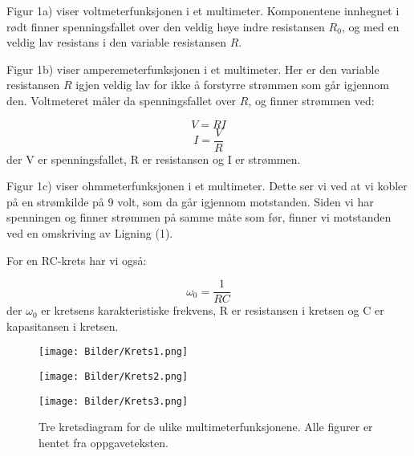\documentclass[norsk,a4paper,12pt]{article}
\begin{document}
Figur 1a) viser voltmeterfunksjonen i et multimeter. Komponentene innhegnet i rødt finner spenningsfallet over den veldig høye indre resistansen $R_0$, og med en veldig lav resistans i den variable resistansen $R$. 

Figur 1b) viser amperemeterfunksjonen i et multimeter. Her er den variable resistansen $R$ igjen veldig lav for ikke å forstyrre strømmen som går igjennom den. Voltmeteret måler da spenningsfallet over $R$, og finner strømmen ved:


\begin{equation}
V = RI
\label{eq:ohm}
\end{equation}
\[I = \frac{V}{R}\]
der V er spenningsfallet, R er resistansen og I er strømmen.

Figur 1c) viser ohmmeterfunksjonen i et multimeter. Dette ser vi ved at vi kobler på en strømkilde på 9 volt, som da går igjennom motstanden. Siden vi har spenningen og finner strømmen på samme måte som før, finner vi motstanden ved en omskriving av Ligning (1).

For en RC-krets har vi også:

\begin{equation}
\omega_0 = \frac{1}{RC}
\label{eq:ohm}
\end{equation}
der $\omega_0$ er kretsens karakteristiske frekvens, R er resistansen i kretsen og C er kapasitansen i kretsen. 



\begin{figure}
\centering
\begin{minipage}{.3\textwidth}
  \centering
  \texttt{[image: Bilder/Krets1.png]}\\
  \label{fig:krets1}
\end{minipage}%
\begin{minipage}{.1\textwidth}
  \centering
  \label{fig:space}
\end{minipage}%
\begin{minipage}{.3\textwidth}
  \centering
  \texttt{[image: Bilder/Krets2.png]}\\
  \label{fig:krets2}
\end{minipage}
\begin{minipage}{.3\textwidth}
  \centering
  \texttt{[image: Bilder/Krets3.png]}\\
  \label{fig:krets3}
\end{minipage}
\caption{Tre kretsdiagram for de ulike multimeterfunksjonene. Alle figurer er hentet fra oppgaveteksten.}
  \label{fig:kretser}
\end{figure}
\end{document}
